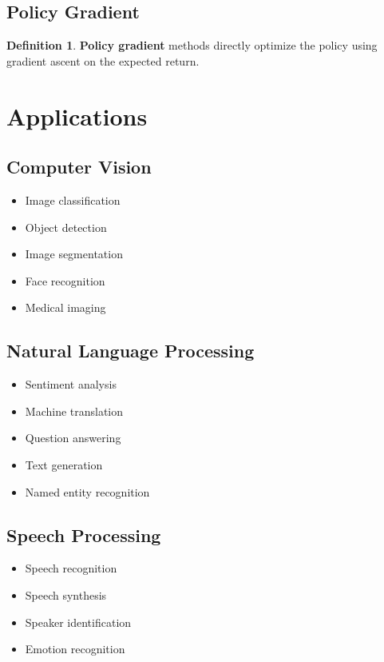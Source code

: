 \documentclass[11pt]{article}
\theoremstyle{definition}
\newtheorem{definition}{Definition}[section]
\begin{document}
\subsection{Policy Gradient}
\begin{definition}
\textbf{Policy gradient} methods directly optimize the policy using gradient ascent on the expected return.
\end{definition}

\section{Applications}

\subsection{Computer Vision}
\begin{itemize}
    \item Image classification
    \item Object detection
    \item Image segmentation
    \item Face recognition
    \item Medical imaging
\end{itemize}

\subsection{Natural Language Processing}
\begin{itemize}
    \item Sentiment analysis
    \item Machine translation
    \item Question answering
    \item Text generation
    \item Named entity recognition
\end{itemize}

\subsection{Speech Processing}
\begin{itemize}
    \item Speech recognition
    \item Speech synthesis
    \item Speaker identification
    \item Emotion recognition
\end{itemize}
\end{document}
